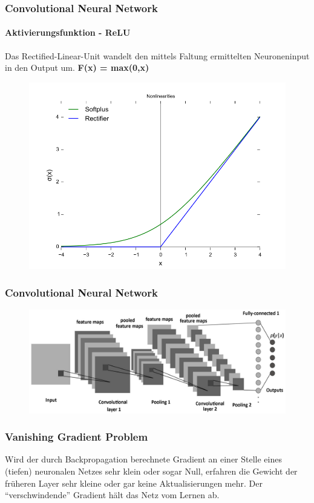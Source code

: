 \documentclass{beamer}
\begin{document}
\begin{frame}
\frametitle{Convolutional Neural Network}
\framesubtitle{Aktivierungsfunktion -  ReLU}
Das Rectified-Linear-Unit wandelt den mittels Faltung ermittelten Neuroneninput in den Output um. \textbf{F(x) = max(0,x)}

\begin{figure}
	\centering
	\includegraphics[width=0.7\linewidth]{figures/relu.png}
	\label{img:relu}
\end{figure}
\end{frame}

\begin{frame}
\frametitle{Convolutional Neural Network}
\begin{figure}
	\centering
	\includegraphics[width=\linewidth]{figures/network.png}
	\label{img:maxpooling}
\end{figure}

\end{frame}





\begin{frame}
\frametitle{Vanishing Gradient Problem}

Wird der durch Backpropagation berechnete Gradient an einer Stelle eines (tiefen) neuronalen Netzes sehr klein oder sogar Null, erfahren die Gewicht der früheren Layer sehr kleine oder gar keine Aktualisierungen mehr. Der ``verschwindende'' Gradient hält das Netz vom Lernen ab.
\end{frame}
\end{document}
